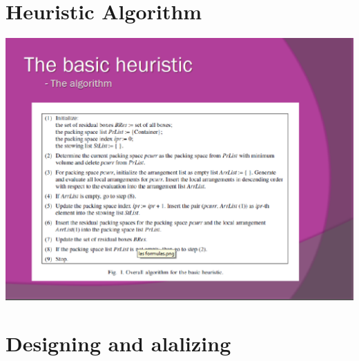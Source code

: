 \documentclass[spanish,a4paper,11pt,twoside]{report}
\begin{document}


\renewcommand{\thepage}{\arabic{page}}
\setcounter{page}{1}

\setlength{\parindent}{5mm}

\chapter{Heuristic Algorithm}
\label{chapter:obj}


\begin{center}
\includegraphics[width=1\textwidth]{images/picn5.eps}\\[0.25cm]
\end{center}

\chapter{Designing and alalizing }
\label{chapter:teo}
\end{document}
